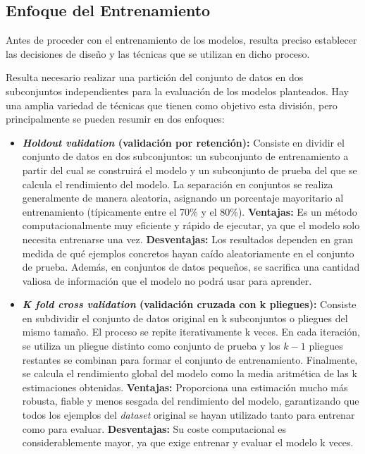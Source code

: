 \clearpage

\subsection{Enfoque del Entrenamiento}\label{sec:enfoque_entrenamiento}
Antes de proceder con el entrenamiento de los modelos, resulta preciso establecer las decisiones de diseño y las técnicas que se utilizan en dicho proceso.

Resulta necesario realizar una partición del conjunto de datos en dos subconjuntos independientes para la evaluación de los modelos planteados. Hay una amplia variedad de técnicas que tienen como objetivo esta división, pero principalmente se pueden resumir en dos enfoques: 
\begin{itemize}
	\item \textbf{\textit{Holdout validation} (validación por retención):} Consiste en dividir el conjunto de datos en dos subconjuntos: un subconjunto de entrenamiento a partir del cual se construirá el modelo y un subconjunto de prueba del que se calcula el rendimiento del modelo. La separación en conjuntos se realiza generalmente de manera aleatoria, asignando un porcentaje mayoritario al entrenamiento (típicamente entre el 70\% y el 80\%).
		\subitem \textbf{Ventajas:} Es un método computacionalmente muy eficiente y rápido de ejecutar, ya que el modelo solo necesita entrenarse una vez.
		\subitem \textbf{Desventajas:} Los resultados dependen en gran medida de qué ejemplos concretos hayan caído aleatoriamente en el conjunto de prueba. Además, en conjuntos de datos pequeños, se sacrifica una cantidad valiosa de información que el modelo no podrá usar para aprender.
	\item \textbf{\textit{K fold cross validation} (validación cruzada con k pliegues):} Consiste en subdividir el conjunto de datos original en k subconjuntos o pliegues del mismo tamaño. El proceso se repite iterativamente k veces. En cada iteración, se utiliza un pliegue distinto como conjunto de prueba y los $k - 1$ pliegues restantes se combinan para formar el conjunto de entrenamiento. Finalmente, se calcula el rendimiento global del modelo como la media aritmética de las k estimaciones obtenidas.
		\subitem \textbf{Ventajas:} Proporciona una estimación mucho más robusta, fiable y menos sesgada del rendimiento del modelo, garantizando que todos los ejemplos del \textit{dataset} original se hayan utilizado tanto para entrenar como para evaluar.
		\subitem \textbf{Desventajas:} Su coste computacional es considerablemente mayor, ya que exige entrenar y evaluar el modelo k veces.
\end{itemize}

